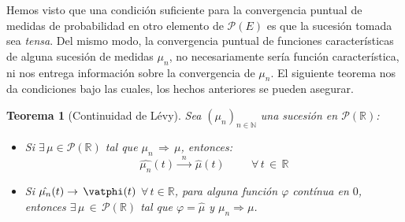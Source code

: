 \documentclass[a4paper]{article}
\newtheorem{teorema}{Teorema}
\numberwithin{equation}{subsection}
\def\R{\mathbb R}
\def\N{\mathbb N}
\begin{document}
Hemos visto que una condición suficiente para la convergencia puntual de medidas de probabilidad en otro elemento de $\mathcal{P}(E)$ es que la sucesión tomada sea \textit{tensa}. Del mismo modo, la convergencia puntual de funciones características de alguna sucesión de medidas $\mu_n$, no necesariamente sería función característica, ni nos entrega información sobre la convergencia de $\mu_n$. El siguiente teorema nos da condiciones bajo las cuales, los hechos anteriores se pueden asegurar.\\ \newline
\begin{teorema}[Continuidad de Lévy] Sea $(\mu_n)_{n\in\N}$ una sucesión en $\mathcal{P}(\R)$:
\begin{itemize}
    \item[i)] Si $\exists\,\mu\in\mathcal{P}(\R)$ tal que $\mu_n\,\Rightarrow\,\mu$, entonces:
    \[\hat{\mu_n}(t)\xrightarrow{\,\,\,n\,\,\,}\,\hat{\mu}(t) \hspace{1cm} \forall \, t \,\in\,\R\]
    \item[ii)] Si $\hat{\mu_n}(t)\rightarrow\,\vatphi(t)$ $\forall\,t\in\R$, para alguna función $\varphi$ contínua en $0$, entonces $\exists\,\mu\,\in\,\mathcal{P}(\R)$ tal que $\varphi = \hat{\mu}$ y $\mu_n \Rightarrow\mu$.
\end{itemize}
\end{teorema}
\\ \newline
\end{document}
